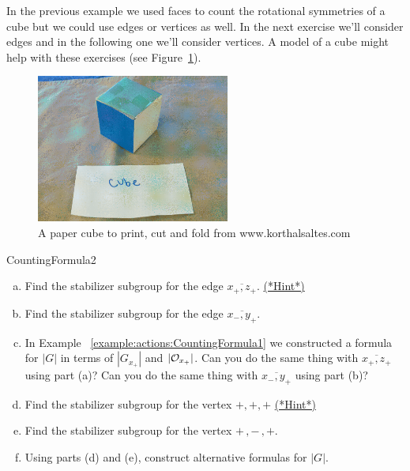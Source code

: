 In the previous example we used faces to count the rotational symmetries of a cube but we could use edges or vertices as well.  In the next exercise we'll consider edges and in the following one we'll consider vertices.   A model of a cube might help with these exercises (see Figure~\ref{fig:CubeFold}).

\begin{figure}[ht]
\begin{center}
\includegraphics[width=2.5in]{images/CubeFold.png}
\caption{A paper cube to print, cut and fold from www.korthalsaltes.com}
 \label{fig:CubeFold}
\end{center}
\end{figure}

\begin {exercise}{CountingFormula2}
\begin {enumerate}[(a)]
\item Find the stabilizer subgroup for the edge $\overline{x_+,z_+}$. 
\hyperref[sec:actions:hints]{(*Hint*)}
\item Find the stabilizer subgroup for the edge $\overline{x_-,y_+}$.
\item In Example ~\ref {example:actions:CountingFormula1} we constructed a formula for $|G|$ in terms of $| G_{x_+}|$ and $|{\cal O}_{x_+}|$.  Can you do the same thing with $\overline{x_+,z_+}$ using part (a)?  Can you do the same thing with $\overline{x_-,y_+}$ using part (b)?  
\item Find the stabilizer subgroup for the vertex $+,+,+$ 
\hyperref[sec:actions:hints]{(*Hint*)}
\item Find the stabilizer subgroup for the vertex $+\,,-\,,+$. 
\item Using parts (d) and (e), construct alternative formulas for $|G|$.
\end{enumerate}
\end{exercise}

